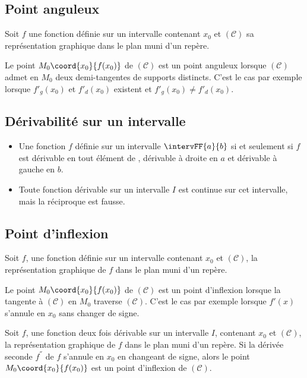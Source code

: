 \subsection{Point anguleux}
\begin{definition}
	Soit $f$ une fonction définie sur un intervalle contenant $x_0$ et $(\mathcal{C})$ sa représentation graphique dans le plan muni d'un repère.
	\par Le point $M_0\coord{x_0}{f(x_0)}$ de $(\mathcal{C})$ est un point anguleux lorsque $(\mathcal{C})$ admet en $M_0$ deux demi-tangentes de supports distincts. C'est le cas par exemple lorsque $f'_g(x_0)$ et $f'_d(x_0)$ existent et $f'_g(x_0)\neq f'_d(x_0)$.\\
	\hspace*{4cm} 
\end{definition}

\subsection{Dérivabilité sur un intervalle}
\begin{propriete}
	\begin{itemize}
	\item Une fonction $f$ définie sur un intervalle $\intervFF{a}{b}$ si et seulement si $f$ est dérivable en tout élément de , dérivable à droite en $a$ et dérivable à gauche en $b$.
	 \item Toute fonction dérivable sur un intervalle $I$ est continue sur cet intervalle, mais la réciproque est fausse.
	\end{itemize}
\end{propriete}
\subsection{Point d'inflexion}
\begin{definition}
Soit $f$, une fonction définie sur un intervalle contenant $x_0$ et $(\mathcal{C})$, la représentation graphique de $f$ dans le plan muni d'un repère.
\par Le point $M_0\coord{x_0}{f(x_0)}$ de $(\mathcal{C})$ est un point d'inflexion lorsque la tangente à $(\mathcal{C})$ en $M_0$ traverse $(\mathcal{C})$. C'est le cas par exemple lorsque $f'(x)$ s'annule en $x_0$ sans changer de signe.
\end{definition}
\hspace*{-0.8cm}
\begin{propriete}
	Soit $f$, une fonction deux fois dérivable sur un intervalle $I$, contenant $x_0$ et $(\mathcal{C})$, la représentation graphique de $f$ dans le plan muni d'un repère. Si la dérivée seconde $f^{''}$ de $f$ s'annule en $x_0$ en changeant de signe, alors le point $M_0\coord{x_0}{f(x_0)}$ est un point d'inflexion de $(\mathcal{C})$.
\end{propriete}
